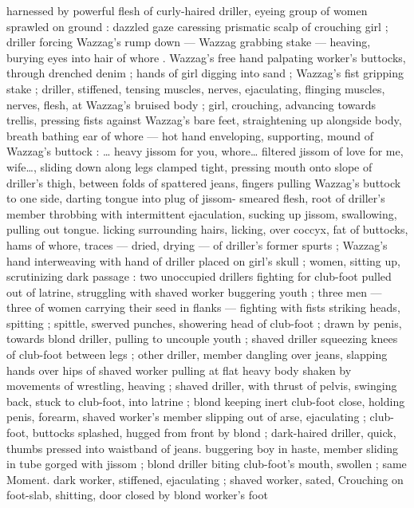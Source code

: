 harnessed by powerful flesh of curly-haired driller, eyeing group of 
women sprawled on ground : dazzled gaze caressing prismatic scalp 
of crouching girl ; driller forcing Wazzag's rump down --- Wazzag 
grabbing stake --- heaving, burying eyes into hair of whore . 
Wazzag's free hand palpating worker's buttocks, through drenched 
denim ; hands of girl digging into sand ; Wazzag's fist gripping stake 
; driller, stiffened, tensing muscles, nerves, ejaculating, flinging 
muscles, nerves, flesh, at Wazzag's bruised body ; girl, crouching, 
advancing towards trellis, pressing fists against Wazzag's bare feet, 
straightening up alongside body, breath bathing ear of whore --- hot 
hand enveloping, supporting, mound of Wazzag's buttock : {\gl}{\ldots} heavy 
jissom for you, whore{\ldots} filtered jissom of love for me, wife{\ldots}{\gr}, sliding 
down along legs clamped tight, pressing mouth onto slope of 
driller's thigh, between folds of spattered jeans, fingers pulling 
Wazzag's buttock to one side, darting tongue into plug of jissom- 
smeared flesh, root of driller's member throbbing with intermittent 
ejaculation, sucking up jissom, swallowing, pulling out tongue. licking 
surrounding hairs, licking, over coccyx, fat of buttocks, hams of 
whore, traces --- dried, drying --- of driller's former spurts ; 
Wazzag's hand interweaving with hand of driller placed on girl's skull 
; women, sitting up, scrutinizing dark passage : two unoccupied 
drillers fighting for club-foot pulled out of latrine, struggling with 
shaved worker buggering youth ; three men --- three of women 
carrying their seed in flanks --- fighting with fists striking heads, 
spitting ; spittle, swerved punches, showering head of club-foot ; 
drawn by penis, towards blond driller, pulling to uncouple youth ; 
shaved driller squeezing knees of club-foot between legs ; other 
driller, member dangling over jeans, slapping hands over hips of 
shaved worker pulling at flat heavy body shaken by movements of 
wrestling, heaving ; shaved driller, with thrust of pelvis, swinging 
back, stuck to club-foot, into latrine ; blond keeping inert club-foot 
close, holding penis, forearm, shaved worker's member slipping out 
of arse, ejaculating ; club-foot, buttocks splashed, hugged from front 
by blond ; dark-haired driller, quick, thumbs pressed into waistband 
of jeans. buggering boy in haste, member sliding in tube gorged with 
jissom ; blond driller biting club-foot's mouth, swollen ; same 
Moment. dark worker, stiffened, ejaculating ; shaved worker, sated, 
Crouching on foot-slab, shitting, door closed by blond worker's foot 
